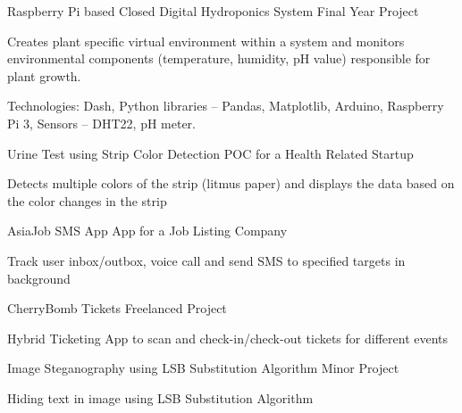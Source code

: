 
\begin{cventries}
  \cventry
    {} %
    {Raspberry Pi based Closed Digital Hydroponics System} %
    {Final Year Project} %
    {} %
    {
      \begin{cvitems} %
        \item {Creates plant specific virtual environment within a system and monitors environmental components (temperature, humidity, pH value) responsible for plant growth.}
        \item {Technologies: Dash, Python libraries – Pandas, Matplotlib, Arduino, Raspberry Pi 3, Sensors – DHT22, pH meter.}
      \end{cvitems}
    }

  \cventry
    {} %
    {Urine Test using Strip Color Detection} %
    {POC for a Health Related Startup} %
    {} %
    {
      \begin{cvitems} %
      	\item {Detects multiple colors of the strip (litmus paper) and displays the data based on the color changes in the strip }
      \end{cvitems}
    }
    
  \cventry
    {} %
    {AsiaJob SMS App} %
    {App for a Job Listing Company} %
    {} %
    {
      \begin{cvitems} %
      	\item {Track user inbox/outbox, voice call and send SMS to specified targets in background}
      \end{cvitems}
    }
    
  \cventry
    {} %
    {CherryBomb Tickets} %
    {Freelanced Project} %
    {} %
    {
      \begin{cvitems} %
      	\item {Hybrid Ticketing App to scan and check-in/check-out tickets for different events}
      \end{cvitems}
    }
    
  \cventry
    {} %
    {Image Steganography using LSB Substitution Algorithm} %
    {Minor Project} %
    {} %
    {
      \begin{cvitems} %
      	\item {Hiding text in image using LSB Substitution Algorithm}
      \end{cvitems}
    }
    

\end{cventries}

